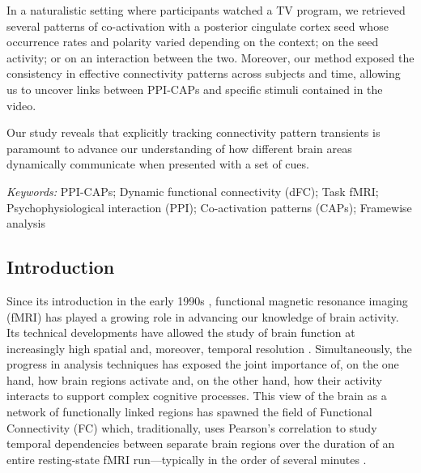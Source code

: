 In a naturalistic setting where participants watched a TV program, we retrieved several patterns of co-activation with a posterior cingulate cortex seed whose occurrence rates and polarity varied depending on the context; on the seed activity; or on an interaction between the two. Moreover, our method exposed the consistency in effective connectivity patterns across subjects and time, allowing us to uncover links between PPI-CAPs and specific stimuli contained in the video. 

Our study reveals that explicitly tracking connectivity pattern transients is paramount to advance our understanding of how different brain areas dynamically communicate when presented with a set of cues.

\textit{Keywords:} PPI-CAPs; Dynamic functional connectivity (dFC); Task fMRI; Psychophysiological interaction (PPI); Co-activation patterns (CAPs); Framewise analysis 
 
\subsection{Introduction}

Since its introduction in the early 1990s \citep{Ogawa1990}, functional magnetic resonance imaging (fMRI) has played a growing role in advancing our knowledge of brain activity.  Its technical developments have allowed the study of brain function at increasingly high spatial and, moreover, temporal resolution \citep{VanEssen2013}. Simultaneously, the progress in analysis techniques has exposed the joint importance of, on the one hand, how brain regions activate and, on the other hand, how their activity interacts to support complex cognitive processes. This view of the brain as a network of functionally linked regions has spawned the field of Functional Connectivity (FC) which, traditionally, uses Pearson's correlation to study temporal dependencies between separate brain regions over the duration of an entire resting-state fMRI run---typically in the order of several minutes \citep{VandenHeuvel2010a}. 

